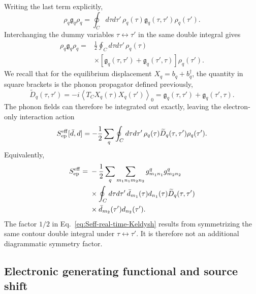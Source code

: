 \documentclass[
 reprint,
 superscriptaddress,
 amsmath,amssymb,
 aps,prb,
 longbibliography,
 floatfix
]{revtex4-2}
\begin{document}
Writing the last term explicitly,
\begin{equation*}
\rho_q\mathfrak g_q\rho_q
=
\oint_C d\tau d\tau'\,
\rho_q(\tau)
\mathfrak g_q(\tau,\tau')
\rho_q(\tau').
\end{equation*}
Interchanging the dummy variables \(\tau\leftrightarrow\tau'\) in the same double integral gives
\begin{align*}
\rho_q\mathfrak g_q\rho_q
={}&
\frac12
\oint_C d\tau d\tau'\,
\rho_q(\tau)
\\
&\times
\left[
\mathfrak g_q(\tau,\tau')
+
\mathfrak g_q(\tau',\tau)
\right]
\rho_q(\tau').
\end{align*}
We recall that for the equilibrium displacement \(X_q=b_q+b_q^\dagger\), the quantity in square brackets is the phonon propagator defined previously,
\begin{equation*}
\widetilde D_q(\tau,\tau')
=
-i
\left\langle
T_C X_q(\tau)X_q(\tau')
\right\rangle_0
=
\mathfrak g_q(\tau,\tau')
+
\mathfrak g_q(\tau',\tau).
\end{equation*}
The phonon fields can therefore be integrated out exactly, leaving the electron-only interaction action
\begin{equation}
S_{\rm ep}^{\rm eff}[\bar d,d]
=
-\frac12
\sum_q
\oint_C d\tau d\tau'\,
\rho_q(\tau)
\widetilde D_q(\tau,\tau')
\rho_q(\tau').
\label{eq:Seff-real-time-Keldysh}
\end{equation}
Equivalently,
\begin{align*}
S_{\rm ep}^{\rm eff}
={}&
-\frac12
\sum_q
\sum_{m_1n_1m_2n_2}
g_{m_1n_1}^{q}
g_{m_2n_2}^{q}
\\
&\times
\oint_C d\tau d\tau'\,
\bar d_{m_1}(\tau)d_{n_1}(\tau)
\widetilde D_q(\tau,\tau')
\\
&\times
\bar d_{m_2}(\tau')d_{n_2}(\tau').
\end{align*}
The factor \(1/2\) in
Eq.~\eqref{eq:Seff-real-time-Keldysh} results from symmetrizing the same contour double integral under \(\tau\leftrightarrow\tau'\). It is therefore not an additional diagrammatic symmetry factor.

\subsection{Electronic generating functional and source shift}
\label{subsec:pf-source-shift}
\end{document}
